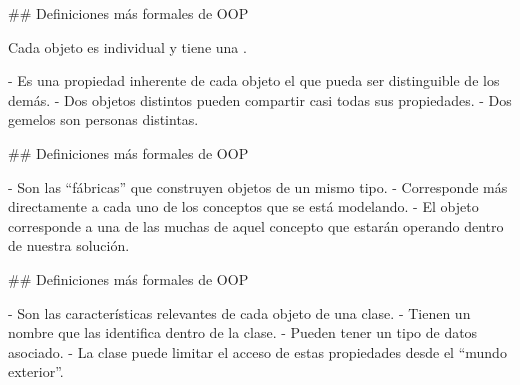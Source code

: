 ## Definiciones más formales de OOP

\newline

Cada objeto es individual y tiene una .\newline

- Es una propiedad inherente de cada objeto el que pueda ser distinguible de los demás.
- Dos objetos distintos pueden compartir casi todas sus propiedades.
    - Dos gemelos son personas distintas.


## Definiciones más formales de OOP


- Son las ``fábricas'' que construyen objetos de un mismo tipo.
- Corresponde más directamente a cada uno de los conceptos que se está modelando.
    - El objeto corresponde a una de las muchas  de aquel concepto
    que estarán operando dentro de nuestra solución.

\centering{}

## Definiciones más formales de OOP


- Son las características relevantes de cada objeto de una clase.
- Tienen un nombre que las identifica dentro de la clase.
- Pueden tener un tipo de datos asociado.
- La clase puede limitar el acceso de estas propiedades desde el ``mundo exterior''.

\centering{}


